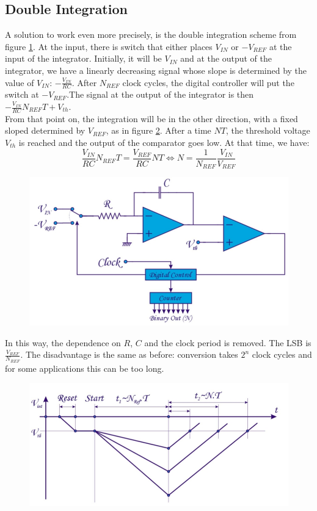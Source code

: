 \subsection{Double Integration}
A solution to work even more precisely, is the double integration scheme from figure \ref{fig:adc2}. At the input, there is switch that either places $V_{IN}$ or $-V_{REF}$ at the input of the integrator. Initially, it will be $V_{IN}$ and at the output of the integrator, we have a linearly decreasing signal whose slope is determined by the value of $V_{IN}$: $- \frac{V_{IN}}{RC}$. After $N_{REF}$ clock cycles, the digital controller will put the switch at $-V_{REF}$.The signal at the output of the integrator is then $-\frac{V_{IN}}{RC} N_{REF} T + V_{th}$.\\
From that point on, the integration will be in the other direction, with a fixed sloped determined by $V_{REF}$, as in figure \ref{fig:adc3}. After a time $NT$, the threshold voltage $V_{th}$ is reached and the output of the comparator goes low. At that time, we have:
$$
\frac{V_{IN}}{RC} N_{REF} T = \frac{V_{REF}}{RC} N T \Leftrightarrow N = \frac{1}{N_{REF}}\frac{V_{IN}}{V_{REF}}
$$
\begin{figure}[h!]
	\centering
	\includegraphics[width=14cm]{figures/ch18/adc2.jpg}
	\caption{}
	\label{fig:adc2}
\end{figure}
In this way, the dependence on $R$, $C$ and the clock period is removed. The LSB is $\frac{V_{REF}}{N_{REF}}$. The disadvantage is the same as before: conversion takes $2^n$ clock cycles and for some applications this can be too long.
\begin{figure}[h!]
	\centering
	\includegraphics[width=14cm]{figures/ch18/adc3.jpg}
	\caption{}
	\label{fig:adc3}
\end{figure}

